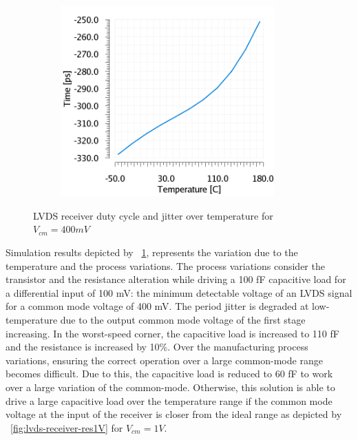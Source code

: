 \begin{figure}[htp]
\begin{subfigure}[b]{0.32\textwidth}
        \includegraphics[width=0.9\textwidth]{Chapter5/Figs/lvds/ErrorClockPeriod.png}
    \end{subfigure}
    \caption{LVDS receiver duty cycle and jitter over temperature for $V_{cm} = 400 mV$}
    \label{fig:lvds-receiver-res}
\end{figure}

Simulation results depicted by \figurename~\ref{fig:lvds-receiver-res}, represents the variation due to the temperature and the process variations. The process variations consider the transistor and the resistance alteration while driving a 100 fF capacitive load for a differential input of 100 mV: the minimum detectable voltage of an LVDS signal for a common mode voltage of 400 mV. The period jitter is degraded at low-temperature due to the output common mode voltage of the first stage increasing. In the worst-speed corner, the capacitive load is increased to 110 fF and the resistance is increased by 10\%. Over the manufacturing process variations, ensuring the correct operation over a large common-mode range becomes difficult. Due to this, the capacitive load is reduced to 60 fF to work over a large variation of the common-mode. Otherwise, this solution is able to drive a large capacitive load over the temperature range if the common mode voltage at the input of the receiver is closer from the ideal range as depicted by \figurename~\ref{fig:lvds-receiver-res1V} for $V_{cm} = 1 V$.

